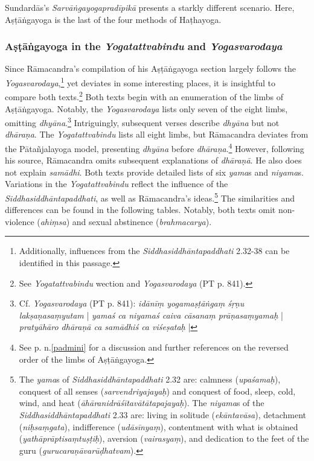 Sundardās's \textit{Sarvāṅgayogapradīpikā} presents a starkly different scenario. Here, Aṣṭāṅgayoga is the last of the four methods of Haṭhayoga.

\subsubsection{Aṣṭāṅgayoga in the \textit{Yogatattvabindu} and \textit{Yogasvarodaya}}

Since Rāmacandra's compilation of his Aṣṭāṅgayoga section largely follows the \textit{Yogasvarodaya},\footnote{Additionally, influences from the \emph{Siddhasiddhāntapaddhati} 2.32-38 can be identified in this passage.} yet deviates in some interesting places, it is insightful to compare both texts.\footnote{See \emph{Yogatattvabindu} wection  and \textit{Yogasvarodaya} (PT p. 841).}
Both texts begin with an enumeration of the limbs of Aṣṭāṅgayoga. Notably, the \emph{Yogasvarodaya} lists only seven of the eight limbs, omitting \textit{dhyāna}.\footnote{Cf. \textit{Yogasvarodaya} (PT p. 841): \textit{idānīṃ yogamaṣṭāṅgaṃ śṛṇu lakṣaṇasaṃyutam} | \textit{yamaś ca niyamaś caiva cāsanaṃ prāṇasaṃyamaḥ} | \textit{pratyāhāro dhāraṇā ca samādhiś ca viśeṣataḥ} |} Intriguingly, subsequent verses describe \textit{dhyāna} but not \textit{dhāraṇa}. The \textit{Yogatattvabindu} lists all eight limbs, but Rāmacandra deviates from the Pātañjalayoga model, presenting \textit{dhyāna} before \textit{dhāraṇa}.\footnote{See p.\pageref{padmini} n.\ref{padmini} for a discussion and further references on the reversed order of the limbs of Aṣṭāṅgayoga.} However, following his source, Rāmacandra omits subsequent explanations of \textit{dhāraṇā}. He also does not explain \emph{samādhi}.
Both texts provide detailed lists of six \textit{yama}s and \textit{niyama}s. Variations in the \textit{Yogatattvabindu} reflect the influence of the \emph{Siddhasiddhāntapaddhati}, as well as Rāmacandra's ideas.\footnote{The \textit{yama}s of \textit{Siddhasiddhāntapaddhati} 2.32 are: calmness (\textit{upaśamaḥ}), conquest of all senses (\textit{sarvendriyajayaḥ}) and conquest of food, sleep, cold, wind, and heat (\textit{āhāranidrāśītavātātapajayaḥ}). The \textit{niyama}s of the \textit{Siddhasiddhāntapaddhati} 2.33 are: living in solitude (\textit{ekāntavāsa}), detachment (\textit{niḥsaṃgata}), indifference (\textit{udāsīnyaṃ}), contentment with what is obtained (\textit{yathāprāptisaṃtuṣṭiḥ}), aversion (\textit{vairasyaṃ}), and dedication to the feet of the guru (\textit{gurucaraṇāvarūḍhatvam}).} The similarities and differences can be found in the following tables. Notably, both texts omit non-violence (\emph{ahiṃsa}) and sexual abstinence (\textit{brahmacarya}).

